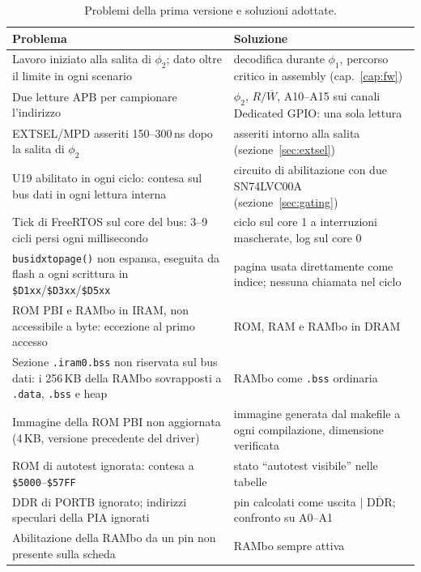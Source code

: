 \documentclass[11pt,a4paper,twoside,openright]{report}
\DeclareRobustCommand{\code}[1]{\begingroup\renewcommand{\_}{\textunderscore\allowbreak}\texttt{#1}\endgroup}
\newcommand{\sig}[1]{\textsf{#1}}
\newcommand{\hex}[1]{\texttt{\$#1}}
\begin{document}
\begin{table}[htbp]
  \centering
  \caption{Problemi della prima versione e soluzioni adottate.}
  \label{tab:problemi}
  \small
  \begin{tabularx}{\textwidth}{>{\raggedright}p{5.2cm}X}
    \toprule
    \textbf{Problema} & \textbf{Soluzione} \\
    \midrule
    Lavoro iniziato alla salita di $\phi_2$; dato oltre il limite in ogni scenario &
      decodifica durante $\phi_1$, percorso critico in assembly (cap.~\ref{cap:fw}) \\
    Due letture APB per campionare l'indirizzo &
      $\phi_2$, $R/\overline{W}$, A10--A15 sui canali Dedicated GPIO: una sola lettura \\
    \sig{EXTSEL}/\sig{MPD} asseriti 150--300\,ns dopo la salita di $\phi_2$ &
      asseriti intorno alla salita (sezione~\ref{sec:extsel}) \\
    U19 abilitato in ogni ciclo: contesa sul bus dati in ogni lettura interna &
      circuito di abilitazione con due SN74LVC00A (sezione~\ref{sec:gating}) \\
    Tick di FreeRTOS sul core del bus: 3--9 cicli persi ogni millisecondo &
      ciclo sul core 1 a interruzioni mascherate, log sul core 0 \\
    \code{bus\_idx\_to\_page()} non espansa, eseguita da flash a ogni scrittura in
      \hex{D1xx}/\hex{D3xx}/\hex{D5xx} &
      pagina usata direttamente come indice; nessuna chiamata nel ciclo \\
    ROM PBI e RAMbo in IRAM, non accessibile a byte: eccezione al primo accesso &
      ROM, RAM e RAMbo in DRAM \\
    Sezione \code{.iram0.bss} non riservata sul bus dati: i 256\,KB della RAMbo
      sovrapposti a \code{.data}, \code{.bss} e heap &
      RAMbo come \code{.bss} ordinaria \\
    Immagine della ROM PBI non aggiornata (4\,KB, versione precedente del driver) &
      immagine generata dal makefile a ogni compilazione, dimensione verificata \\
    ROM di autotest ignorata: contesa a \hex{5000}--\hex{57FF} &
      stato \enquote{autotest visibile} nelle tabelle \\
    DDR di PORTB ignorato; indirizzi speculari della PIA ignorati &
      pin calcolati come uscita $|$ $\overline{\text{DDR}}$; confronto su A0--A1 \\
    Abilitazione della RAMbo da un pin non presente sulla scheda &
      RAMbo sempre attiva \\
    \bottomrule
  \end{tabularx}
\end{table}
\end{document}
